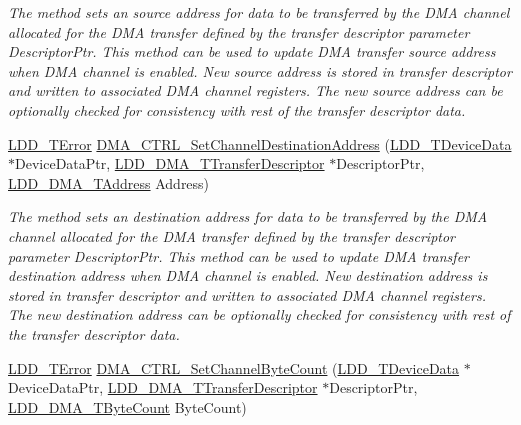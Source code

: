 \begin{DoxyCompactItemize}
\begin{DoxyCompactList}\small\item\em The method sets an source address for data to be transferred by the D\-M\-A channel allocated for the D\-M\-A transfer defined by the transfer descriptor parameter Descriptor\-Ptr. This method can be used to update D\-M\-A transfer source address when D\-M\-A channel is enabled. New source address is stored in transfer descriptor and written to associated D\-M\-A channel registers. The new source address can be optionally checked for consistency with rest of the transfer descriptor data. \end{DoxyCompactList}\item 
\hyperlink{group___p_e___types__module_ga24c2b045fd04e79e85f261ce4df35588}{L\-D\-D\-\_\-\-T\-Error} \hyperlink{group___d_m_a___c_t_r_l__module_ga6eda6f1b27d9f04235bd0304fad7db0e}{D\-M\-A\-\_\-\-C\-T\-R\-L\-\_\-\-Set\-Channel\-Destination\-Address} (\hyperlink{group___p_e___types__module_gac5cf1362f1f0e3a2ce71b1bf2276d091}{L\-D\-D\-\_\-\-T\-Device\-Data} $\ast$Device\-Data\-Ptr, \hyperlink{struct_l_d_d___d_m_a___t_transfer_descriptor}{L\-D\-D\-\_\-\-D\-M\-A\-\_\-\-T\-Transfer\-Descriptor} $\ast$Descriptor\-Ptr, \hyperlink{group___p_e___types__module_gab8287f62db7ff96992355760b652cd07}{L\-D\-D\-\_\-\-D\-M\-A\-\_\-\-T\-Address} Address)
\begin{DoxyCompactList}\small\item\em The method sets an destination address for data to be transferred by the D\-M\-A channel allocated for the D\-M\-A transfer defined by the transfer descriptor parameter Descriptor\-Ptr. This method can be used to update D\-M\-A transfer destination address when D\-M\-A channel is enabled. New destination address is stored in transfer descriptor and written to associated D\-M\-A channel registers. The new destination address can be optionally checked for consistency with rest of the transfer descriptor data. \end{DoxyCompactList}\item 
\hyperlink{group___p_e___types__module_ga24c2b045fd04e79e85f261ce4df35588}{L\-D\-D\-\_\-\-T\-Error} \hyperlink{group___d_m_a___c_t_r_l__module_ga04ea535c86b9e0054c137c2aa38668cc}{D\-M\-A\-\_\-\-C\-T\-R\-L\-\_\-\-Set\-Channel\-Byte\-Count} (\hyperlink{group___p_e___types__module_gac5cf1362f1f0e3a2ce71b1bf2276d091}{L\-D\-D\-\_\-\-T\-Device\-Data} $\ast$Device\-Data\-Ptr, \hyperlink{struct_l_d_d___d_m_a___t_transfer_descriptor}{L\-D\-D\-\_\-\-D\-M\-A\-\_\-\-T\-Transfer\-Descriptor} $\ast$Descriptor\-Ptr, \hyperlink{group___p_e___types__module_gac001a681eb67942fa78ac9b62ba3b0d6}{L\-D\-D\-\_\-\-D\-M\-A\-\_\-\-T\-Byte\-Count} Byte\-Count)

\end{DoxyCompactItemize}
